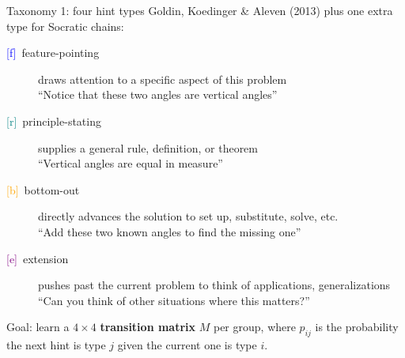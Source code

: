\documentclass[10pt,aspectratio=169]{beamer}
\newcommand{\hf}{\textcolor{blue}{[f]}}
\newcommand{\hr}{\textcolor{teal}{[r]}}
\newcommand{\hb}{\textcolor{orange}{[b]}}
\newcommand{\he}{\textcolor{purple}{[e]}}
\begin{document}
\begin{frame}{Taxonomy 1: four hint types}
  Goldin, Koedinger \& Aleven (2013) plus one extra type for Socratic chains:
  \medskip
  \begin{description}
    \item[\hf~feature-pointing] draws attention to a specific aspect of this problem \\ {\small ``Notice that these two angles are vertical angles''} \pause 
    \item[\hr~principle-stating] supplies a general rule, definition, or theorem \\ 
          {\small ``Vertical angles are equal in measure''} \pause 
    \item[\hb~bottom-out] directly advances the solution to set up, substitute, solve, etc. \\
          {\small ``Add these two known angles to find the missing one''} \pause 
    \item[\he~extension] pushes past the current problem to think of applications, generalizations \\
          {\small ``Can you think of other situations where this matters?''}  
  \end{description}
  \medskip
  \pause 
    Goal: learn a $4\times4$ \textbf{transition matrix} $M$ per group, where $p_{ij}$ is the probability the next hint is type $j$ given the current one is type $i$.

\end{frame}
\end{document}
